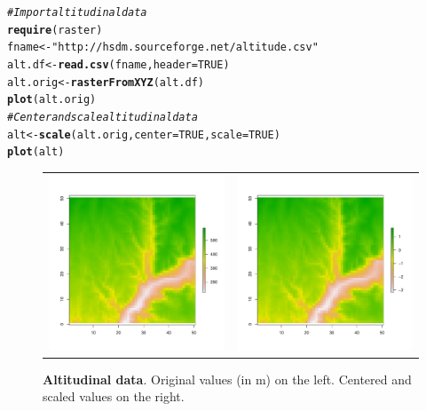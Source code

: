\documentclass[a4paper, 12pt, leqno]{article}\usepackage[]{graphicx}\usepackage[]{color}
\makeatletter
\newcommand{\hlnum}[1]{\textcolor[rgb]{0.686,0.059,0.569}{#1}}%
\newcommand{\hlstr}[1]{\textcolor[rgb]{0.192,0.494,0.8}{#1}}%
\newcommand{\hlcom}[1]{\textcolor[rgb]{0.678,0.584,0.686}{\textit{#1}}}%
\newcommand{\hlstd}[1]{\textcolor[rgb]{0.345,0.345,0.345}{#1}}%
\newcommand{\hlkwb}[1]{\textcolor[rgb]{0.69,0.353,0.396}{#1}}%
\newcommand{\hlkwc}[1]{\textcolor[rgb]{0.333,0.667,0.333}{#1}}%
\newcommand{\hlkwd}[1]{\textcolor[rgb]{0.737,0.353,0.396}{\textbf{#1}}}%
\newenvironment{kframe}{%
 \def\at@end@of@kframe{}%
 \ifinner\ifhmode%
  \def\at@end@of@kframe{\end{minipage}}%
  \begin{minipage}{\columnwidth}%
 \fi\fi%
 \def\FrameCommand##1{\hskip\@totalleftmargin \hskip-\fboxsep
 \colorbox{shadecolor}{##1}\hskip-\fboxsep
     \hskip-\linewidth \hskip-\@totalleftmargin \hskip\columnwidth}%
 \MakeFramed {\advance\hsize-\width
   \@totalleftmargin\z@ \linewidth\hsize
   \@setminipage}}%
 {\par\unskip\endMakeFramed%
 \at@end@of@kframe}
\newenvironment{knitrout}{}{} %
\makeatother
\begin{document}
\begin{knitrout}\small
{}\color{fgcolor}\begin{kframe}
\begin{alltt}
\hlcom{# Import altitudinal data}
\hlkwd{require}\hlstd{(raster)}
\hlstd{fname} \hlkwb{<-} \hlstr{"http://hsdm.sourceforge.net/altitude.csv"}
\hlstd{alt.df} \hlkwb{<-} \hlkwd{read.csv}\hlstd{(fname,}\hlkwc{header}\hlstd{=}\hlnum{TRUE}\hlstd{)}
\hlstd{alt.orig} \hlkwb{<-} \hlkwd{rasterFromXYZ}\hlstd{(alt.df)}
\hlkwd{plot}\hlstd{(alt.orig)}
\hlcom{# Center and scale altitudinal data}
\hlstd{alt} \hlkwb{<-} \hlkwd{scale}\hlstd{(alt.orig,}\hlkwc{center}\hlstd{=}\hlnum{TRUE}\hlstd{,}\hlkwc{scale}\hlstd{=}\hlnum{TRUE}\hlstd{)}
\hlkwd{plot}\hlstd{(alt)}
\end{alltt}
\end{kframe}
\end{knitrout}


\begin{figure}[!h] 
  \begin{tabular}{cc}
    \includegraphics[width=8cm]{figures/Altitude1.pdf} &
    \includegraphics[width=8cm]{figures/Altitude2.pdf} \\
  \end{tabular}
  \caption{\textbf{Altitudinal data}. Original values (in m) on the left. Centered and
    scaled values on the right.}
  \label{fig:Altitude}
\end{figure}
\end{document}
